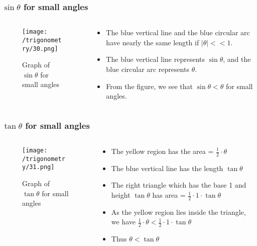\documentclass{beamer}
\begin{document}
    \begin{frame}
        \frametitle{\(\sin \theta\) for small angles}
        \begin{columns}
            \begin{column}{0.5\textwidth}
                \begin{figure}
                    \centering
                    \texttt{[image: /trigonometry/30.png]}
                    \caption{Graph of \(\sin \theta\) for small angles}
                \end{figure}
            \end{column}
            \begin{column}{0.5\textwidth}
                \begin{itemize}
                    \item The blue vertical line and the blue circular arc have nearly the same length if \(|\theta| << 1\).
                    \item The blue vertical line represents \(\sin \theta\), and the blue circular arc represents \(\theta\).
                    \item From the figure, we see that \(\sin \theta < \theta\) for small angles.
                \end{itemize}
            \end{column}
        \end{columns}
        \end{frame}

    \begin{frame}
        \frametitle{\(\tan \theta\) for small angles}
        \begin{columns}
            \begin{column}{0.5\textwidth}
                \begin{figure}
                    \centering
                    \texttt{[image: /trigonometry/31.png]}
                    \caption{Graph of \(\tan \theta\) for small angles}
                \end{figure}
            \end{column}
            \begin{column}{0.5\textwidth}
                \begin{itemize}
                    \item The yellow region has the area = \(\frac{1}{2} \cdot \theta\)  
                    \item The blue vertical line has the length \(\tan \theta\) 
                    \item The right triangle which has the base 1 and height \(\tan \theta\) has area = \(\frac{1}{2} \cdot 1 \cdot \tan \theta\)
                    \item As the yellow region lies inside the triangle, we have \(\frac{1}{2} \cdot \theta < \frac{1}{2} \cdot 1 \cdot \tan \theta\)  
                    \item Thus \(\theta < \tan \theta\)     
                \end{itemize}
            \end{column}
        \end{columns}
    \end{frame}
\end{document}
